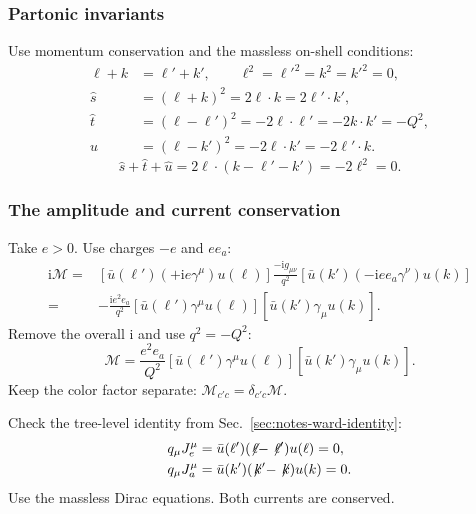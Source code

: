 \documentclass[14pt,a4paper]{extarticle}
\numberwithin{equation}{section}
\newcommand{\M}{\mathcal M}
\newcommand{\ii}{\mathrm i}
\newcommand{\slsh}[1]{\not\!#1}
\begin{document}
\subsubsection{Partonic invariants}
Use momentum conservation and the massless on-shell conditions:
\begin{align}
 \ell+k&=\ell'+k',\qquad
 \ell^2=\ell'^2=k^2=k'^2=0,\\
 \hat s&=(\ell+k)^2=2\ell\cdot k=2\ell'\cdot k',\\
 \hat t&=(\ell-\ell')^2=-2\ell\cdot\ell'=-2k\cdot k'=-Q^2,\\
 \hat u&=(\ell-k')^2=-2\ell\cdot k'=-2\ell'\cdot k.
 \label{eq:hard-dot-products}
\end{align}
\begin{equation}
 \hat s+\hat t+\hat u
 =2\ell\cdot(k-\ell'-k')=-2\ell^2=0.
 \label{eq:hard-mandelstam}
\end{equation}

\subsubsection{The amplitude and current conservation}
Take $e>0$. Use charges $-e$ and $ee_a$:
\begin{align}
 \ii\M={}&
 [\bar u(\ell')(+\ii e\gamma^\mu)u(\ell)]
 \frac{-\ii g_{\mu\nu}}{q^2}
 [\bar u(k')(-\ii ee_a\gamma^\nu)u(k)]\\
 ={}&-\frac{\ii e^2e_a}{q^2}
 [\bar u(\ell')\gamma^\mu u(\ell)]
 [\bar u(k')\gamma_\mu u(k)].
\end{align}
Remove the overall $\ii$ and use $q^2=-Q^2$:
\begin{equation}
 \boxed{\M=\frac{e^2e_a}{Q^2}
 [\bar u(\ell')\gamma^\mu u(\ell)]
 [\bar u(k')\gamma_\mu u(k)].}
 \label{eq:hard-amplitude}
\end{equation}
Keep the color factor separate: $\M_{c'c}=\delta_{c'c}\M$.

Check the tree-level identity from Sec.~\ref{sec:notes-ward-identity}:
\begin{align}
 q_\mu J_e^\mu
 &=\bar u(\ell')(\slsh\ell-\slsh{\ell'})u(\ell)=0,\\
 q_\mu J_a^\mu
 &=\bar u(k')(\slsh{k'}-\slsh k)u(k)=0.
\end{align}
Use the massless Dirac equations. Both currents are conserved.
\end{document}
